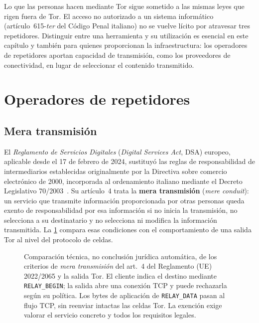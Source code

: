 Lo que las personas hacen mediante Tor sigue sometido a las mismas leyes que rigen fuera de Tor. El acceso no autorizado a un sistema informático (artículo~615-\emph{ter} del Código Penal italiano) no se vuelve lícito por atravesar tres repetidores. Distinguir entre una herramienta y su utilización es esencial en este capítulo y también para quienes proporcionan la infraestructura: los operadores de repetidores aportan capacidad de transmisión, como los proveedores de conectividad, en lugar de seleccionar el contenido transmitido.

\section{Operadores de repetidores}\label{sec:legale-relay}

\subsection{Mera transmisión}

El \emph{Reglamento de Servicios Digitales} (\emph{Digital Services Act}, DSA) europeo, aplicable desde el 17 de febrero de 2024, sustituyó las reglas de responsabilidad de intermediarios establecidas originalmente por la Directiva sobre comercio electrónico de 2000, incorporada al ordenamiento italiano mediante el Decreto Legislativo 70/2003~\cite{dsa2022}. Su artículo~4 trata la \textbf{mera transmisión} (\emph{mere conduit}): un servicio que transmite información proporcionada por otras personas queda exento de responsabilidad por esa información si no inicia la transmisión, no selecciona a su destinatario y no selecciona ni modifica la información transmitida. La \cref{fig:conduit} compara esas condiciones con el comportamiento de una salida Tor al nivel del protocolo de celdas.

\begin{figure}[htbp]
\centering

\caption{Comparación técnica, no conclusión jurídica automática, de los criterios de \emph{mera transmisión} del art.~4 del Reglamento (UE) 2022/2065 y la salida Tor. El cliente indica el destino mediante \texttt{RELAY\_BEGIN}; la salida abre una conexión TCP y puede rechazarla según su política. Los bytes de aplicación de \texttt{RELAY\_DATA} pasan al flujo TCP, sin reenviar intactas las celdas Tor. La exención exige valorar el servicio concreto y todos los requisitos legales.}
\label{fig:conduit}
\end{figure}


